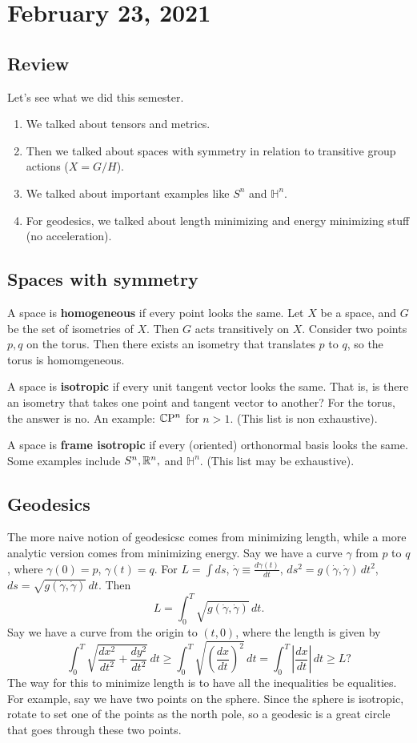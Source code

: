 \section{February 23, 2021}
\subsection{Review}
Let's see what we did this semester.
\begin{enumerate}[label=(\arabic*)]
    \item We talked about tensors and metrics.
    \item Then we talked about spaces with symmetry in relation to transitive group actions ($X=G /H$).
    \item We talked about important examples like $S^n $ and $\mathbb H^n $.
    \item For geodesics, we talked about length minimizing and energy minimizing stuff (no acceleration).
\end{enumerate}
\subsection{Spaces with symmetry}
\hspace{\parindent}A space is \textbf{homogeneous} if every point looks the same. Let $X$ be a space, and $G$ be the set of isometries of $X$. Then $G$ acts transitively on $X$. Consider two points $p,q$ on the torus. Then there exists an isometry that translates $p$ to $q$, so the torus is homomgeneous.

A space is \textbf{isotropic} if every unit tangent vector looks the same. That is, is there an isometry that takes one point and tangent vector to another? For the torus, the answer is no. An example: $\mathbb{C} \mathrm P^n $ for $n>1$. (This list is non exhaustive).

A space is \textbf{frame isotropic} if every (oriented) orthonormal basis looks the same. Some examples include $S^n , \mathbb{R}^n , $ and $\mathbb H^n $. (This list may be exhaustive).

\subsection{Geodesics}
The more naive notion of geodesicsc comes from minimizing length, while a more analytic version comes from minimizing energy. Say we have a curve $\gamma $ from $p$ to $q$, where $\gamma (0)=p$, $\gamma (t)=q$. For $L=\int ds$, $\dot \gamma \equiv \frac{d\gamma (t)}{dt}$, $ds ^2= g(\dot \gamma ,\dot \gamma )\,dt ^2$, $ds=\sqrt{g(\dot \gamma , \dot \gamma )} \,dt$. Then \[
    L= \int_{0}^{T} \sqrt{g(\dot \gamma ,\dot \gamma )}  \, dt.
\] Say we have a curve from the origin to $(t,0)$, where the length is given by \[
\int_{0}^{T} \sqrt{\frac{dx^2}{dt^2}+\frac{dy^2}{dt^2}}  \, dt \geq \int_{0}^{T} \sqrt{\left( \frac{dx}{dt} \right) ^2}  \, dt= \int_{0}^{T} \left| \frac{dx}{dt}  \right| \, dt \geq L ?
\] The way for this to minimize length is to have all the inequalities be equalities. For example, say we have two points on the sphere. Since the sphere is isotropic, rotate to set one of the points as the north pole, so a geodesic is a great circle that goes through these two points.

